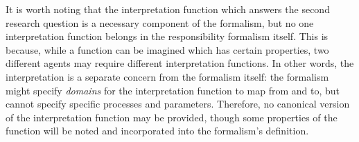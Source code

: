 It is worth noting that the interpretation function which answers the second research question is a necessary component of the formalism, but no one interpretation function belongs in the responsibility formalism itself. This is because, while a function can be imagined which has certain properties, two different agents may require different interpretation functions. In other words, the interpretation is a separate concern from the formalism itself: the formalism might specify \emph{domains} for the interpretation function to map from and to, but cannot specify specific processes and parameters. Therefore, no canonical version of the interpretation function may be provided, though some properties of the function will be noted and incorporated into the formalism's definition.\par
